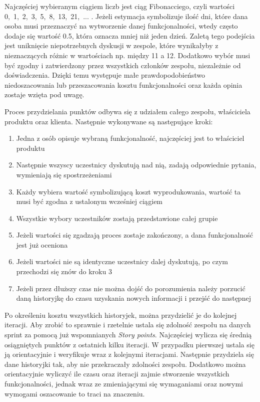 Najczęściej wybieranym ciągiem liczb jest ciąg Fibonacciego, czyli wartości \mbox{0, 1, 2, 3, 5, 8, 13, 21, ...} . Jeżeli estymacja symbolizuje ilość dni, które dana osoba musi przeznaczyć na wytworzenie danej funkcjonalności, wtedy często dodaje się wartość 0.5, która oznacza mniej niż jeden dzień. Zaletą tego podejścia jest uniknięcie niepotrzebnych dyskusji w zespole, które wynikałyby z nieznaczących różnic w wartościach np. między 11 a 12. Dodatkowo wybór musi być zgodny i zatwierdzony przez wszystkich członków zespołu, niezależnie od doświadczenia. Dzięki temu występuje małe prawdopodobieństwo niedoszacowania lub przeszacowania kosztu funkcjonalności oraz każda opinia zostaje wzięta pod uwagę.

Proces przydzielania punktów odbywa się z udziałem całego zespołu, właściciela produktu oraz klienta. Następnie wykonywane są następujące kroki:
\begin{enumerate}
	\item Jedna z osób opisuje wybraną funkcjonalność, najczęściej jest to właściciel produktu
	\item Następnie wszyscy uczestnicy dyskutują nad nią, zadają odpowiednie pytania, wymieniają się spostrzeżeniami
	\item Każdy wybiera wartość symbolizującą koszt wyprodukowania, wartość ta musi być zgodna z ustalonym wcześniej ciągiem
	\item Wszystkie wybory uczestników zostają przedstawione całej grupie
	\item Jeżeli wartości się zgadzają proces zostaje zakończony, a dana funkcjonalność jest już oceniona
	\item Jeżeli wartości nie są identyczne uczestnicy dalej dyskutują, po czym przechodzi się znów do kroku 3
	\item Jeżeli przez dłuższy czas nie można dojść do porozumienia należy porzucić daną historyjkę do czasu uzyskania nowych informacji i przejść do następnej
\end{enumerate}  

Po określeniu kosztu wszystkich historyjek, można przydzielić je do kolejnej iteracji. Aby zrobić to sprawnie i rzetelnie ustala się zdolność zespołu na danych sprint za pomocą już wspomnianych \textit{Story points}. Najczęściej wylicza się średnią osiągniętych punktów z ostatnich kilku iteracji. W przypadku pierwszej ustala się ją orientacyjnie i weryfikuje wraz z kolejnymi iteracjami. Następnie przydziela się dane historyjki tak, aby nie przekraczały zdolności zespołu. Dodatkowo można orientacyjnie wyliczyć ile czasu oraz iteracji zajmie stworzenie wszystkich funkcjonalności, jednak wraz ze zmieniającymi się wymaganiami oraz nowymi wymogami oszacowanie to traci na znaczeniu. 



